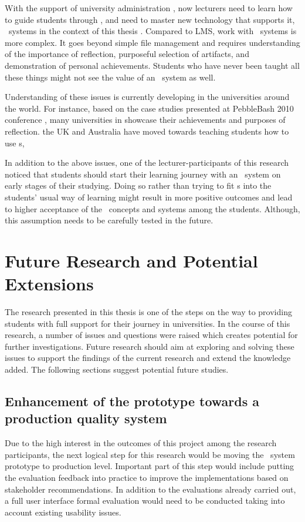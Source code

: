 With the support of university administration \citep{DiBenedetto2005}, now
lecturers need to learn how to guide students through \LLLsn, and need to master
new technology that supports it, \ep~systems in the context of this thesis
\citep{Levin2008}. Compared to LMS, work with \ep~systems is more complex. It
goes beyond simple file management and requires understanding of the importance
of reflection, purposeful selection of artifacts, and demonstration of personal
achievements. Students who have never been taught all these things might not see
the value of an \ep~system as well.

Understanding of these issues is currently developing in the universities
around the world. For instance, based on the case studies presented at
PebbleBash 2010 conference \citep{PebbleLearningLtd2010a}, many universities in
showcase their achievements and purposes of reflection.
the UK and Australia have moved towards teaching students how to use \ep s,

In addition to the above issues, one of the lecturer-participants of this
research noticed that students should start their learning journey with an
\ep~system on early stages of their studying. Doing so rather than trying to fit
\ep s into the students' usual way of learning might result in more positive
outcomes and lead to higher acceptance of the \ep~concepts and systems among the
students. Although, this assumption needs to be carefully tested in the future.

\section{Future Research and Potential Extensions}
The research presented in this thesis is one of the steps on the way to
providing students with full support for their \LLLs journey in universities. In
the course of this research, a number of issues and questions were raised which
creates potential for further investigations. Future research should aim at
exploring and solving these issues to support the findings of the current
research and extend the knowledge added. The following sections suggest
potential future studies.

\subsection[Enhancement of the prototype]{Enhancement of the prototype towards a
production quality system} 
Due to the high interest in the outcomes of this project among the research
participants, the next logical step for this research would be moving the
\ep~system prototype to production level. Important part of this step would
include putting the evaluation feedback into practice to improve the
implementations based on stakeholder recommendations. In addition to the
evaluations already carried out, a full user interface formal evaluation would
need to be conducted taking into account existing usability issues.

